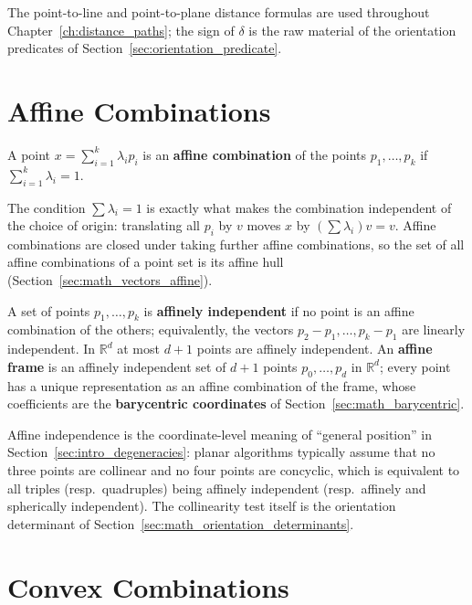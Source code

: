 The point-to-line and point-to-plane distance formulas are used throughout
Chapter~\ref{ch:distance_paths}; the sign of $\delta$ is the raw material of
the orientation predicates of Section~\ref{sec:orientation_predicate}.


\section{Affine Combinations}
\label{sec:math_affine_combinations}

\begin{definition}\label{def:math_affine_combination}
  A point $x = \sum_{i=1}^k \lambda_i p_i$ is an \textbf{affine combination}
  of the points $p_1,\dots,p_k$ if $\sum_{i=1}^k \lambda_i = 1$.
\end{definition}

The condition $\sum \lambda_i = 1$ is exactly what makes the combination
independent of the choice of origin: translating all $p_i$ by $v$ moves $x$
by $(\sum \lambda_i) v = v$. Affine combinations are closed under taking
further affine combinations, so the set of all affine combinations of a
point set is its affine hull (Section~\ref{sec:math_vectors_affine}).

A set of points $p_1,\dots,p_k$ is \textbf{affinely independent} if no point
is an affine combination of the others; equivalently, the vectors
$p_2 - p_1, \dots, p_k - p_1$ are linearly independent. In $\mathbb{R}^d$ at
most $d+1$ points are affinely independent. An \textbf{affine frame} is an
affinely independent set of $d+1$ points $p_0,\dots,p_d$ in
$\mathbb{R}^d$; every point has a unique representation as an affine
combination of the frame, whose coefficients are the
\textbf{barycentric coordinates} of Section~\ref{sec:math_barycentric}.

Affine independence is the coordinate-level meaning of ``general position''
in Section~\ref{sec:intro_degeneracies}: planar algorithms typically assume
that no three points are collinear and no four points are concyclic, which is
equivalent to all triples (resp.\ quadruples) being affinely independent
(resp.\ affinely and spherically independent). The collinearity test itself
is the orientation determinant of Section~\ref{sec:math_orientation_determinants}.


\section{Convex Combinations}
\label{sec:math_convex_combinations}

